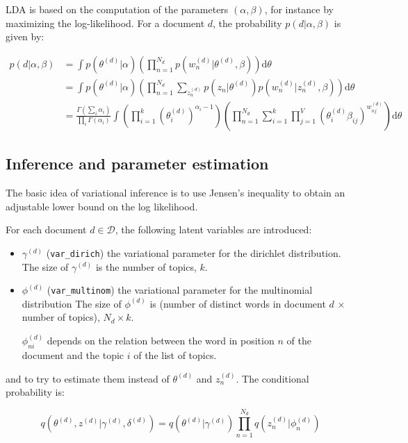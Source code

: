 \documentclass{article}
\begin{document}
LDA is based on the computation of the parameters $(\alpha, \beta)$, for instance by maximizing the log-likelihood. For a document $d$, the probability $p(d|\alpha, \beta)$ is given by:

\begin{align*}
p(d|\alpha, \beta) 
& = \int p(\theta^{(d)}|\alpha) \left( \prod_{n=1}^{N_{d}} p(w_n^{(d)}|\theta^{(d)}, \beta)\right) \text{d}\theta  \\
& = \int p(\theta^{(d)}|\alpha) \left( \prod_{n=1}^{N_{d}} \sum_{z_n^{(d)}} p(z_n|\theta^{(d)}) p(w_n^{(d)}|z_n^{(d)}, \beta)\right) \text{d}\theta  \\
& = \frac{\Gamma\left( \sum_i \alpha_i\right)}{\prod_i \Gamma(\alpha_i)} \int \left( \prod_{i=1}^k (\theta_i^{(d)})^{\alpha_i - 1} \right) \left( \prod_{n=1}^{N_d} \sum_{i=1}^k \prod_{j=1}^V (\theta_i^{(d)} \beta_{ij})^{w_{nj}^{(d)}} \right) \text{d}\theta
\end{align*}

\subsection{Inference and parameter estimation}

The basic idea of variational inference is to use Jensen's inequality to obtain an adjustable lower bound on the log likelihood.

For each document $d \in \mathcal{D}$, the following latent variables are introduced:
 \begin{itemize}
\setlength\itemsep{-0.2em}
  \item $\gamma^{(d)}$ (\verb"var_dirich") the variational parameter for the dirichlet distribution. The size of $\gamma^{(d)}$ is the number of topics, $k$.
  \item $\phi^{(d)}$ (\verb"var_multinom") the variational parameter for the multinomial distribution The size of $\phi^{(d)}$ is (number of distinct words in document $d$ $\times$ number of topics), $N_d \times k$.
  
  $\phi_{ni}^{(d)}$ depends on the relation between the word in position $n$ of the document and the topic $i$ of the list of topics.
   \end{itemize}

and to try to estimate them instead of $\theta^{(d)}$ and $z_n^{(d)}$. The conditional probability is:

\[ q(\theta^{(d)}, z^{(d)}|\gamma^{(d)}, \delta^{(d)}) = q(\theta^{(d)}|\gamma^{(d)}) \prod_{n=1}^{N_d} q(z_n^{(d)}|\phi_n^{(d)})\]
\end{document}
